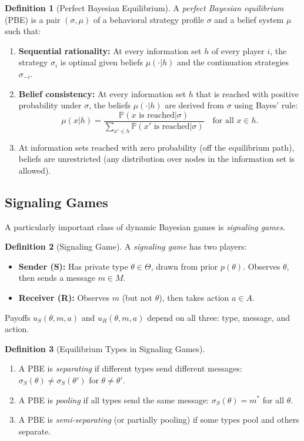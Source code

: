 \documentclass[11pt,a4paper]{article}
\theoremstyle{definition}
\newtheorem{definition}{Definition}[section]
\theoremstyle{plain}
\theoremstyle{remark}
\newcommand{\Prob}{\mathbb{P}}
\begin{document}
\begin{definition}[Perfect Bayesian Equilibrium]
\label{def:pbe}
A \emph{perfect Bayesian equilibrium} (PBE) is a pair $(\sigma, \mu)$ of a behavioral
strategy profile $\sigma$ and a belief system $\mu$ such that:
\begin{enumerate}[label=(\alph*)]
    \item \textbf{Sequential rationality:} At every information set $h$ of every player $i$,
    the strategy $\sigma_i$ is optimal given beliefs $\mu(\cdot | h)$ and the continuation
    strategies $\sigma_{-i}$.
    \item \textbf{Belief consistency:} At every information set $h$ that is reached with
    positive probability under $\sigma$, the beliefs $\mu(\cdot | h)$ are derived from
    $\sigma$ using Bayes' rule:
    \[
        \mu(x | h) = \frac{\Prob(x \text{ is reached} | \sigma)}
        {\sum_{x' \in h} \Prob(x' \text{ is reached} | \sigma)}
        \quad \text{for all } x \in h.
    \]
    \item At information sets reached with zero probability (off the equilibrium path),
    beliefs are unrestricted (any distribution over nodes in the information set is allowed).
\end{enumerate}
\end{definition}

\subsection{Signaling Games}

A particularly important class of dynamic Bayesian games is \emph{signaling games}.

\begin{definition}[Signaling Game]
\label{def:signaling-game}
A \emph{signaling game} has two players:
\begin{itemize}
    \item \textbf{Sender (S):} Has private type $\theta \in \Theta$, drawn from prior
    $p(\theta)$. Observes $\theta$, then sends a message $m \in M$.
    \item \textbf{Receiver (R):} Observes $m$ (but not $\theta$), then takes action
    $a \in A$.
\end{itemize}
Payoffs $u_S(\theta, m, a)$ and $u_R(\theta, m, a)$ depend on all three: type, message,
and action.
\end{definition}

\begin{definition}[Equilibrium Types in Signaling Games]
\label{def:equilibrium-types}
\begin{enumerate}[label=(\alph*)]
    \item A PBE is \emph{separating} if different types send different messages:
    $\sigma_S(\theta) \neq \sigma_S(\theta')$ for $\theta \neq \theta'$.
    \item A PBE is \emph{pooling} if all types send the same message:
    $\sigma_S(\theta) = m^*$ for all $\theta$.
    \item A PBE is \emph{semi-separating} (or partially pooling) if some types pool and
    others separate.
\end{enumerate}
\end{definition}
\end{document}
